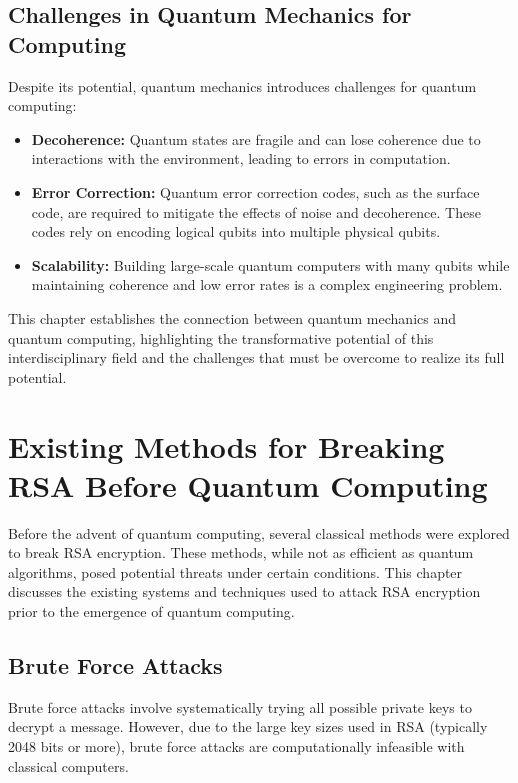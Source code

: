 \documentclass[12pt,a4paper]{report}
\begin{document}
\section{Challenges in Quantum Mechanics for Computing}
Despite its potential, quantum mechanics introduces challenges for quantum computing:
\begin{itemize}
    \item \textbf{Decoherence:} Quantum states are fragile and can lose coherence due to interactions with the environment, leading to errors in computation.
    \item \textbf{Error Correction:} Quantum error correction codes, such as the surface code, are required to mitigate the effects of noise and decoherence. These codes rely on encoding logical qubits into multiple physical qubits.
    \item \textbf{Scalability:} Building large-scale quantum computers with many qubits while maintaining coherence and low error rates is a complex engineering problem.
\end{itemize}

This chapter establishes the connection between quantum mechanics and quantum computing, highlighting the transformative potential of this interdisciplinary field and the challenges that must be overcome to realize its full potential.

\chapter{Existing Methods for Breaking RSA Before Quantum Computing}
\label{chap:existing_methods}
Before the advent of quantum computing, several classical methods were explored to break RSA encryption. These methods, while not as efficient as quantum algorithms, posed potential threats under certain conditions. This chapter discusses the existing systems and techniques used to attack RSA encryption prior to the emergence of quantum computing.

\section{Brute Force Attacks}
Brute force attacks involve systematically trying all possible private keys to decrypt a message. However, due to the large key sizes used in RSA (typically 2048 bits or more), brute force attacks are computationally infeasible with classical computers.
\end{document}
